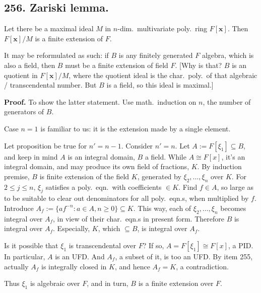 \documentclass[12pt]{article}
\newcommand{\V}\mathbf%
\newcommand{\Ss}[1]{\textsf{\bfseries{#1}}}%
\begin{document}
\subsection*{256. Zariski lemma.} Let there be a maximal ideal \(M\) in \(n\)-dim.\ multivariate poly.\ ring \(F[\V{x}]\). 
Then \(F[\V{x}]/M\) is a finite extension of \(F\). \par
It may be reformulated as such: if \(B\) is any finitely generated \(F\) algebra, which is also a field, 
then \(B\) must be a finite extension of field \(F\). 
[Why is that? \(B\) is an quotient in \(F[\V{x}]/M\), where the quotient ideal is the char.\ poly.\ of that algebraic / transcendental number. 
But \(B\) is a field, so this ideal is maximal.] \par
\Ss{Proof.} To show the latter statement. 
Use math.\ induction on \(n\), the number of generators of \(B\). \par
Case \(n=1\) is familiar to us: it is the extension made by a single element. \par
Let proposition be true for \(n' =n -1\). Consider \(n' =n\). 
Let \(A := F[\xi_1] \subseteq B\), and keep in mind \(A\) is an integral domain, \(B\) a field. 
While \(A \cong F[x]\), it's an integral domain, and may produce its own field of fractions, \(K\). 
By induction premise, \(B\) is finite extension of the field \(K\), generated by \(\xi_2,\dotsc,\xi_n\) over \(K\). 
For \(2 \leq j \leq n\), \(\xi_j\) satisfies a poly.\ eqn.\ with coefficients \(\in K\). 
Find \(f \in A\), so large as to be suitable to clear out denominators for all poly.\ eqn.s, when multiplied by \(f\). 
Introduce \(A_f := \{a f^{-n}: a \in A, n \geq 0\} \subseteq K\). 
This way, each of \(\xi_2,\dotsc,\xi_n\) becomes integral over \(A_f\), in view of their char.\ eqn.s in present form. 
Therefore \(B\) is integral over \(A_f\). 
Especially, \(K\), which \(\subseteq B\), is integral over \(A_f\). \par
Is it possible that \(\xi_1\) is transcendental over \(F\)? 
If so, \(A =F[\xi_1] \cong F[x]\), a PID. 
In particular, \(A\) is an UFD. 
And \(A_f\), a subset of it, is too an UFD. 
By item 255, actually \(A_f\) is integrally closed in \(K\), and hence \(A_f =K\), a contradiction. \par
Thus \(\xi_1\) is algebraic over \(F\), and in turn, \(B\) is a finite extension over \(F\). 
\end{document}
